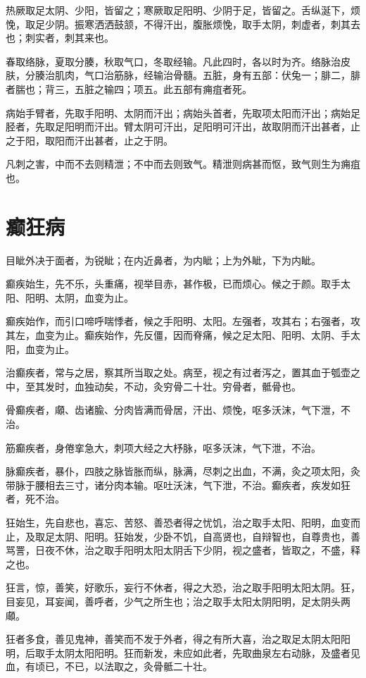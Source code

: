 \documentclass[12pt,UTF8]{ctexbook}
\begin{document}
	热厥取足太阴、少阳，皆留之；寒厥取足阳明、少阴于足，皆留之。舌纵涎下，烦悗，取足少阴。振寒洒洒鼓颔，不得汗出，腹胀烦悗，取手太阴，刺虚者，刺其去也；刺实者，刺其来也。
	
	春取络脉，夏取分腠，秋取气口，冬取经输。凡此四时，各以时为齐。络脉治皮肤，分腠治肌肉，气口治筋脉，经输治骨髓。五脏，身有五部：伏兔一；腓二，腓者腨也；背三，五脏之输四；项五。此五部有痈疽者死。
	
	病始手臂者，先取手阳明、太阴而汗出；病始头首者，先取项太阳而汗出；病始足胫者，先取足阳明而汗出。臂太阴可汗出，足阳明可汗出，故取阴而汗出甚者，止之于阳，取阳而汗出甚者，止之于阴。
	
	凡刺之害，中而不去则精泄；不中而去则致气。精泄则病甚而怄，致气则生为痈疽也。
	\chapter{癫狂病}
	
	目眦外决于面者，为锐眦；在内近鼻者，为内眦；上为外眦，下为内眦。
	
	癫疾始生，先不乐，头重痛，视举目赤，甚作极，已而烦心。候之于颜。取手太阳、阳明、太阴，血变为止。
	
	癫疾始作，而引口啼呼喘悸者，候之手阳明、太阳。左强者，攻其右；右强者，攻其左，血变为止。癫疾始作，先反僵，因而脊痛，候之足太阳、阳明、太阴、手太阳，血变为止。
	
	治癫疾者，常与之居，察其所当取之处。病至，视之有过者泻之，置其血于瓠壶之中，至其发时，血独动矣，不动，灸穷骨二十壮。穷骨者，骶骨也。
	
	骨癫疾者，顑、齿诸腧、分肉皆满而骨居，汗出、烦悗，呕多沃沫，气下泄，不治。
	
	筋癫疾者，身倦挛急大，刺项大经之大杼脉，呕多沃沫，气下泄，不治。
	
	脉癫疾者，暴仆，四肢之脉皆胀而纵，脉满，尽刺之出血，不满，灸之项太阳，灸带脉于腰相去三寸，诸分肉本输。呕吐沃沫，气下泄，不治。癫疾者，疾发如狂者，死不治。
	
	狂始生，先自悲也，喜忘、苦怒、善恐者得之忧饥，治之取手太阳、阳明，血变而止，及取足太阴、阳明。狂始发，少卧不饥，自高贤也，自辩智也，自尊贵也，善骂詈，日夜不休，治之取手阳明太阳太阴舌下少阴，视之盛者，皆取之，不盛，释之也。
	
	狂言，惊，善笑，好歌乐，妄行不休者，得之大恐，治之取手阳明太阳太阴。狂，目妄见，耳妄闻，善呼者，少气之所生也；治之取手太阳太阴阳明，足太阴头两顑。
	
	狂者多食，善见鬼神，善笑而不发于外者，得之有所大喜，治之取足太阴太阳阳明，后取手太阴太阳阳明。狂而新发，未应如此者，先取曲泉左右动脉，及盛者见血，有顷已，不已，以法取之，灸骨骶二十壮。
	
\end{document}
